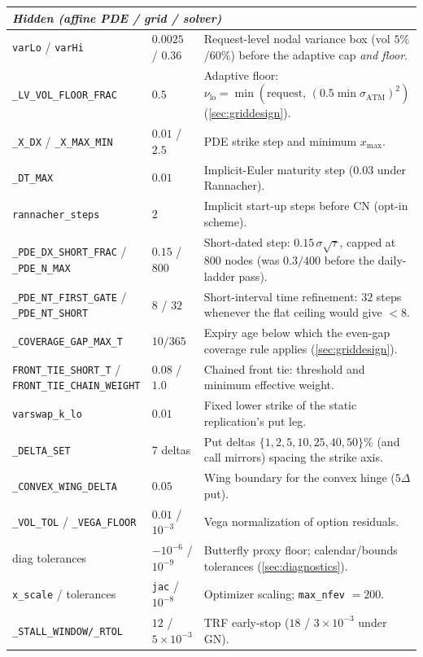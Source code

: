 \documentclass[11pt]{article}
\begin{document}
\begin{longtable}{p{}p{}p{}}
\midrule
\multicolumn{3}{l}{\emph{Hidden (affine PDE / grid / solver)}}\\ \midrule
\texttt{varLo} / \texttt{varHi} & $0.0025$ / $0.36$ & Request-level nodal variance box (vol $5\%$/$60\%$) before the adaptive cap \emph{and floor}.\\
\texttt{\_LV\_VOL\_FLOOR\_FRAC} & $0.5$ & Adaptive floor: $\nu_{\mathrm{lo}}=\min(\text{request},\,(0.5\min\sigma_{\mathrm{ATM}})^2)$ (\cref{sec:griddesign}).\\
\texttt{\_X\_DX} / \texttt{\_X\_MAX\_MIN} & $0.01$ / $2.5$ & PDE strike step and minimum $x_{\max}$.\\
\texttt{\_DT\_MAX} & $0.01$ & Implicit-Euler maturity step ($0.03$ under Rannacher).\\
\texttt{rannacher\_steps} & $2$ & Implicit start-up steps before CN (opt-in scheme).\\
\texttt{\_PDE\_DX\_SHORT\_FRAC} / \texttt{\_PDE\_N\_MAX} & $0.15$ / $800$ & Short-dated step: $0.15\,\sigma\sqrt\tau$, capped at $800$ nodes (was $0.3/400$ before the daily-ladder pass).\\
\texttt{\_PDE\_NT\_FIRST\_GATE} / \texttt{\_PDE\_NT\_SHORT} & $8$ / $32$ & Short-interval time refinement: $32$ steps whenever the flat ceiling would give $<8$.\\
\texttt{\_COVERAGE\_GAP\_MAX\_T} & $10/365$ & Expiry age below which the even-gap coverage rule applies (\cref{sec:griddesign}).\\
\texttt{FRONT\_TIE\_SHORT\_T} / \texttt{FRONT\_TIE\_CHAIN\_WEIGHT} & $0.08$ / $1.0$ & Chained front tie: threshold and minimum effective weight.\\
\texttt{varswap\_k\_lo} & $0.01$ & Fixed lower strike of the static replication's put leg.\\
\texttt{\_DELTA\_SET} & 7 deltas & Put deltas $\{1,2,5,10,25,40,50\}\%$ (and call mirrors) spacing the strike axis.\\
\texttt{\_CONVEX\_WING\_DELTA} & $0.05$ & Wing boundary for the convex hinge ($5\Delta$ put).\\
\texttt{\_VOL\_TOL} / \texttt{\_VEGA\_FLOOR} & $0.01$ / $10^{-3}$ & Vega normalization of option residuals.\\
diag tolerances & $-10^{-6}$ / $10^{-9}$ & Butterfly proxy floor; calendar/bounds tolerances (\cref{sec:diagnostics}).\\
\texttt{x\_scale} / tolerances & \texttt{jac} / $10^{-8}$ & Optimizer scaling; \texttt{max\_nfev} $=200$.\\
\texttt{\_STALL\_WINDOW/\_RTOL} & $12$ / $5\!\times\!10^{-3}$ & TRF early-stop ($18$ / $3\!\times\!10^{-3}$ under GN).\\

\end{longtable}
\end{document}
